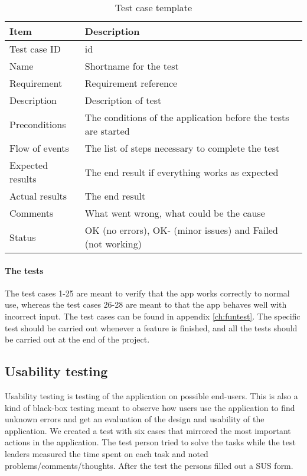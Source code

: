 \begin{table}[h!]
\begin{center}
\begin{tabular}{l|p{10cm}}\hline
\textbf{Item} & \textbf{Description} \\ \hline \hline
Test case ID & id \\ \hline
Name & Shortname for the test\\ \hline
Requirement & Requirement reference\\ \hline
Description & Description of test\\ \hline
Preconditions & The conditions of the application before the tests are started\\ \hline
Flow of events & The list of steps necessary to complete the test \\ \hline
Expected results & The end result if everything works as expected\\ \hline 
Actual results & The end result\\ \hline
Comments & What went wrong, what could be the cause\\ \hline
Status &OK (no errors), OK- (minor issues) and Failed (not working)\\ \hline
\end{tabular}
\end{center}
\caption{Test case template} \label{tab:casetemp1}
\end{table}

\paragraph{The tests}\hfill
\newline
The test cases 1-25 are meant to verify that the app works correctly to normal use, whereas the test cases 26-28 are meant to that the app behaves well with incorrect input. The test cases can be found in appendix \ref{ch:funtest}. The specific test should be carried out whenever a feature is finished, and all the tests should be carried out at the end of the project.
			
\subsection{Usability testing}\label{subsec:usabilitytesting}
Usability testing is testing of the application on possible end-users. This is also a kind of black-box testing meant to observe how users use the application to find unknown errors and get an evaluation of the design and usability of the application. We created a test with six cases that mirrored the most important actions in the application. The test person tried to solve the tasks while the test leaders measured the time spent on each task and noted problems/comments/thoughts. After the test the persons filled out a SUS form.


